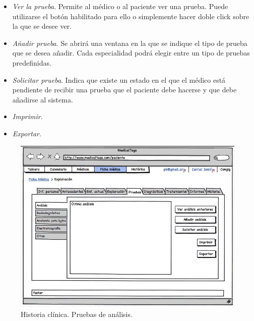 			\begin{itemize}
				\item \textit{Ver la prueba}. Permite al médico o al paciente ver una prueba. Puede utilizarse el botón habilitado para ello o simplemente hacer doble click sobre la que se desee ver.
				\item \textit{Añadir prueba}. Se abrirá una ventana en la que se indique el tipo de prueba que se desea añadir. Cada especialidad podrá elegir entre un tipo de pruebas predefinidas.
				\item \textit{Solicitar prueba}. Indica que existe un estado en el que el médico está pendiente de recibir una prueba que el paciente debe hacerse y que debe añadirse al sistema.
				\item \textit{Imprimir}. 
				\item \textit{Exportar}. 
			\end{itemize}
			
			
			\begin{figure}[H]
			  \centering
			    \includegraphics[width=12cm]{img/png/interfaz/34_Pruebas_Pacientes.png}
			  \caption{Historia clínica. Pruebas de análisis.}
			  \label{fig:iu_prueba_analisis}
			\end{figure}
			
